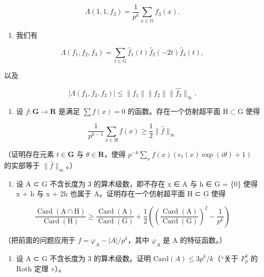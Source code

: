 \[
\Lambda (1, 1, f _ {3}) = \frac {1}{p ^ {k}} \sum_ {x \in \mathrm{G}} f _ {3} (x).
\]

\begin{enumerate}
\def\labelenumi{\alph{enumi})}
\setcounter{enumi}{1}
\tightlist
\item
我们有
\end{enumerate}

\[
\Lambda (f _ {1}, f _ {2}, f _ {3}) = \sum_ {t \in \mathrm{G}} \widehat {f} _ {1} (t) \widehat {f} _ {2} (- 2 t) \widehat {f} _ {3} (t),
\]

以及

\[
| \Lambda (f _ {1}, f _ {2}, f _ {3}) | \leqslant \| f _ {1} \| \| f _ {2} \| \| \widehat {f _ {3}} \| _ {\infty}.
\]

\begin{enumerate}
\def\labelenumi{\alph{enumi})}
\setcounter{enumi}{2}
\tightlist
\item
  设 \(f \colon \mathbf{G} \to \mathbf{R}\) 是满足 \(\sum f(x) = 0\) 的函数。存在一个仿射超平面 \(\mathrm{H} \subset \mathrm{G}\) 使得
\end{enumerate}

\[
\frac {1}{p ^ {k - 1}} \sum_ {x \in \mathrm{H}} f (x) \geqslant \frac {1}{2} \| \widehat {f} \| _ {\infty}
\]

（证明存在元素 \(t \in \mathbf{G}\) 与 \(\theta \in \mathbf{R}\)，使得 \(p^{-k} \sum_{x} f(x)(e_t(x) \exp(i\theta) + 1)\) 的实部等于 \(\| \widehat{f} \|_{\infty}\)。）

\begin{enumerate}
\def\labelenumi{\alph{enumi})}
\setcounter{enumi}{3}
\tightlist
\item
  设 A ⊂ G 不含长度为 3 的算术级数，即不存在 x ∈ A 与 h ∈ G = \{0\} 使得 x + h 与 x + 2h 也属于 A。证明存在一个仿射超平面 H ⊂ G 使得
\end{enumerate}

\[
\frac {\operatorname{Card} (\mathrm{A} \cap \mathrm{H})}{\operatorname{Card} (\mathrm{H})} \geqslant \frac {\operatorname{Card} (\mathrm{A})}{\operatorname{Card} (\mathrm{G})} + \frac {1}{2} \left(\left(\frac {\operatorname{Card} (\mathrm{A})}{\operatorname{Card} (\mathrm{G})}\right) ^ {2} - \frac {1}{p ^ {k}}\right)
\]

（把前面的问题应用于 \(f = \varphi_{A} - |A|/p^{k}\)，其中 \(\varphi_{A}\) 是 A 的特征函数。）

\begin{enumerate}
\def\labelenumi{\alph{enumi})}
\setcounter{enumi}{4}
\tightlist
\item
  设 A ⊂ G 不含长度为 3 的算术级数。证明 \(\text{Card}(A) \leqslant 3p^{k}/k\)（“关于 \(F_{p}^{k}\) 的 Roth 定理 »）。
\end{enumerate}

